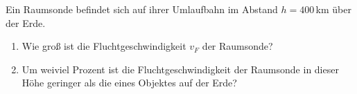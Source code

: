 \begin{ExerciseBlock}
Ein Raumsonde befindet sich auf ihrer Umlaufbahn im Abstand $h=400\,$km über der Erde.

\begin{enumerate}
	\item Wie groß ist die Fluchtgeschwindigkeit $v_F$ der Raumsonde?

	\item Um weiviel Prozent ist die Fluchtgeschwindigkeit der Raumsonde in dieser Höhe geringer als die eines Objektes auf der Erde?

\end{enumerate}
\end{ExerciseBlock}
